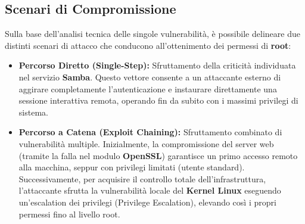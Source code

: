 \documentclass[12pt, a4paper]{article}
\begin{document}
	\subsection{Scenari di Compromissione}
	Sulla base dell'analisi tecnica delle singole vulnerabilità, è possibile delineare due distinti scenari di attacco che conducono all'ottenimento dei permessi di \textbf{root}:
	\begin{itemize}
		\item \textbf{Percorso Diretto (Single-Step):} Sfruttamento della criticità individuata nel servizio \textbf{Samba}. Questo vettore consente a un attaccante esterno di aggirare completamente l'autenticazione e instaurare direttamente una sessione interattiva remota, operando fin da subito con i massimi privilegi di sistema.
		\item \textbf{Percorso a Catena (Exploit Chaining):} Sfruttamento combinato di vulnerabilità multiple. Inizialmente, la compromissione del server web (tramite la falla nel modulo \textbf{OpenSSL}) garantisce un primo accesso remoto alla macchina, seppur con privilegi limitati (utente standard). Successivamente, per acquisire il controllo totale dell'infrastruttura, l'attaccante sfrutta la vulnerabilità locale del \textbf{Kernel Linux} eseguendo un'escalation dei privilegi (Privilege Escalation), elevando così i propri permessi fino al livello root.
	\end{itemize}


\end{document}
